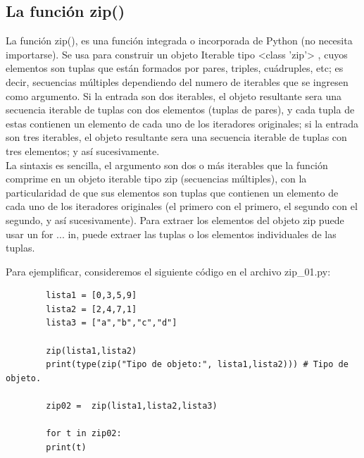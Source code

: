 	
	
	
	
	
	
	
	
	
	
	
	
	
	\subsection{La función {\ttfamily zip()} }
	
	
	
	La función {\ttfamily zip()}, es una función integrada o incorporada de Python (no necesita importarse). Se usa para construir un objeto Iterable tipo {\ttfamily {}<{}class {}'{}zip{}'{}>{} }, cuyos elementos son tuplas  que están formados por pares, triples, cuádruples, etc; es decir, secuencias múltiples dependiendo del numero de iterables que se ingresen como argumento.   Si la entrada son dos iterables, el objeto resultante sera una secuencia iterable de tuplas con dos elementos (tuplas de pares), y cada tupla de  estas contienen un elemento de cada uno de los iteradores originales; si la entrada son tres iterables, el objeto resultante sera una secuencia iterable de tuplas con tres elementos; y  así sucesivamente.\\ 
	
	La sintaxis es sencilla, el argumento son dos o más iterables que la función comprime en un objeto iterable tipo {\ttfamily zip} (secuencias múltiples), con la particularidad de que sus elementos son tuplas que contienen un elemento de cada uno de los iteradores originales (el primero con el primero, el segundo con el segundo, y así sucesivamente).  Para extraer los elementos del objeto {\ttfamily zip} puede usar un  {\ttfamily for ... in}, puede extraer las tuplas o los elementos individuales de las tuplas.
	
	Para ejemplificar, consideremos el siguiente código en el archivo {\ttfamily zip\_01.py}:
	
	
	\hspace{-2.5cm}{\ttfamily \scriptsize zip\_01.py}  \vspace{-0.5cm}
	\begin{lstlisting}		
		lista1 = [0,3,5,9]
		lista2 = [2,4,7,1]
		lista3 = ["a","b","c","d"]
		
		zip(lista1,lista2)	
		print(type(zip("Tipo de objeto:", lista1,lista2))) # Tipo de objeto.
		
		zip02 =  zip(lista1,lista2,lista3)	
		
		for t in zip02:
		print(t)  
	\end{lstlisting}	
	
